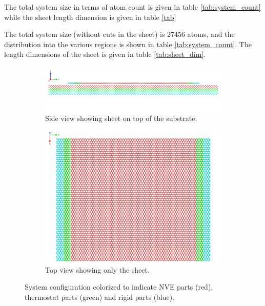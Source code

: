 The total system size in terms of atom count is given in table \ref{tab:system_count} while the sheet length dimension is given in table \ref{tab}

The total system size (without cuts in the sheet) is 27456 atoms, and the distribution into the various regions is shown in table \ref{tab:system_count}. The length dimensions of the sheet is given in table \ref{tab:sheet_dim}.

\begin{figure}[H]
  \centering
  \begin{subfigure}[b]{0.80\textwidth}
      \centering
      \includegraphics[width=\textwidth]{figures/system_sideview.png}
      \caption{Side view showing sheet on top of the substrate.}
      \label{fig:sideview}
  \end{subfigure}
  \hfill
  \begin{subfigure}[b]{0.80\textwidth}
      \centering
      \includegraphics[width=\textwidth]{figures/system_topview.png}
      \caption{Top view showing only the sheet.}
      \label{fig:topview}
  \end{subfigure}
  \hfill
     \caption{System configuration colorized to indicate NVE parts (red), thermostat parts (green) and rigid parts (blue).}
     \label{fig:system}
\end{figure}

